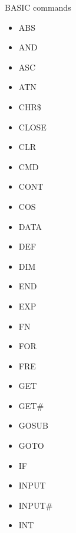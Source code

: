 \documentclass[aspectratio=43]{uva-inf-presentation}
\begin{document}
\begin{frame}{BASIC commands}

\begin{multicols}{3}
\begin{itemize}
\item ABS
\item AND
\item ASC
\item ATN
\item CHR\$
\item CLOSE
\item CLR
\item CMD
\item CONT
\item COS
\item DATA
\item DEF
\item DIM
\item END
\item EXP
\item FN
\item FOR
\item FRE
\item GET
\item GET\#
\item GOSUB
\item GOTO
\item IF
\item INPUT
\item INPUT\#
\item INT
\end{itemize}
\end{multicols}

\end{frame}

\end{document}
